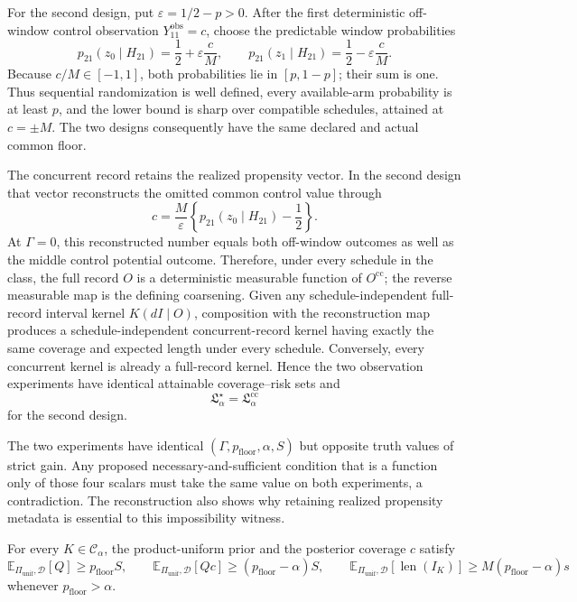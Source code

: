 For the second design, put \(\varepsilon=1/2-p>0\).  After the first deterministic off-window control observation \(Y^{\mathrm{obs}}_{11}=c\), choose the predictable window probabilities
\[
 p_{21}(z_0\mid H_{21})=\frac12+\varepsilon\frac{c}{M},
 \qquad
 p_{21}(z_1\mid H_{21})=\frac12-\varepsilon\frac{c}{M}.
\]
Because \(c/M\in[-1,1]\), both probabilities lie in \([p,1-p]\); their sum is one.  Thus sequential randomization is well defined, every available-arm probability is at least \(p\), and the lower bound is sharp over compatible schedules, attained at \(c=\pm M\).  The two designs consequently have the same declared and actual common floor.

The concurrent record retains the realized propensity vector.  In the second design that vector reconstructs the omitted common control value through
\[
 c=\frac{M}{\varepsilon}
 \left\{p_{21}(z_0\mid H_{21})-\frac12\right\}.
\]
At \(\Gamma=0\), this reconstructed number equals both off-window outcomes as well as the middle control potential outcome.  Therefore, under every schedule in the class, the full record \(O\) is a deterministic measurable function of \(O^{\mathrm{cc}}\); the reverse measurable map is the defining coarsening.  Given any schedule-independent full-record interval kernel \(K(dI\mid O)\), composition with the reconstruction map produces a schedule-independent concurrent-record kernel having exactly the same coverage and expected length under every schedule.  Conversely, every concurrent kernel is already a full-record kernel.  Hence the two observation experiments have identical attainable coverage--risk sets and
\[
 \mathfrak L_\alpha^\star=\mathfrak L_\alpha^{\mathrm{cc}}
\]
for the second design.

The two experiments have identical \((\Gamma,p_{\mathrm{floor}},\alpha,S)\) but opposite truth values of strict gain.  Any proposed necessary-and-sufficient condition that is a function only of those four scalars must take the same value on both experiments, a contradiction.  The reconstruction also shows why retaining realized propensity metadata is essential to this impossibility witness.

For every \(K\in\mathcal C_\alpha\), the product-uniform prior and the posterior coverage \(c\) satisfy
\[
\mathbb E_{\Pi_{\mathrm{unif}},\mathcal D}[Q]\ge p_{\mathrm{floor}}S,
\qquad
\mathbb E_{\Pi_{\mathrm{unif}},\mathcal D}[Qc]\ge(p_{\mathrm{floor}}-\alpha)S,
\qquad
\mathbb E_{\Pi_{\mathrm{unif}},\mathcal D}[\operatorname{len}(I_K)]
\ge M(p_{\mathrm{floor}}-\alpha)s
\]
whenever \(p_{\mathrm{floor}}>\alpha\).


